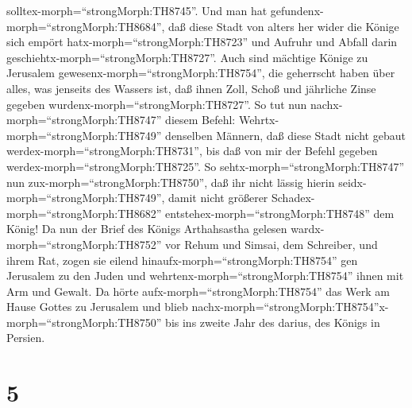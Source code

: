 solltex-morph=``strongMorph:TH8745''. Und man hat
gefundenx-morph=``strongMorph:TH8684'', daß diese Stadt von alters her
wider die Könige sich empört hatx-morph=``strongMorph:TH8723'' und
Aufruhr und Abfall darin geschiehtx-morph=``strongMorph:TH8727''.
 Auch sind mächtige Könige zu Jerusalem
gewesenx-morph=``strongMorph:TH8754'', die geherrscht haben über alles,
was jenseits des Wassers ist, daß ihnen Zoll, Schoß und jährliche Zinse
gegeben wurdenx-morph=``strongMorph:TH8727''.  So tut nun
nachx-morph=``strongMorph:TH8747'' diesem Befehl:
Wehrtx-morph=``strongMorph:TH8749'' denselben Männern, daß diese Stadt
nicht gebaut werdex-morph=``strongMorph:TH8731'', bis daß von mir der
Befehl gegeben werdex-morph=``strongMorph:TH8725''.  So
sehtx-morph=``strongMorph:TH8747'' nun zux-morph=``strongMorph:TH8750'',
daß ihr nicht lässig hierin seidx-morph=``strongMorph:TH8749'', damit
nicht größerer Schadex-morph=``strongMorph:TH8682''
entstehex-morph=``strongMorph:TH8748'' dem König!  Da nun
der Brief des Königs Arthahsastha gelesen
wardx-morph=``strongMorph:TH8752'' vor Rehum und Simsai, dem Schreiber,
und ihrem Rat, zogen sie eilend hinaufx-morph=``strongMorph:TH8754'' gen
Jerusalem zu den Juden und wehrtenx-morph=``strongMorph:TH8754'' ihnen
mit Arm und Gewalt.  Da hörte
aufx-morph=``strongMorph:TH8754'' das Werk am Hause Gottes zu Jerusalem
und blieb
nachx-morph=``strongMorph:TH8754''x-morph=``strongMorph:TH8750'' bis ins
zweite Jahr des darius, des Königs in Persien.

\hypertarget{section-4}{%
\section{5}\label{section-4}}


